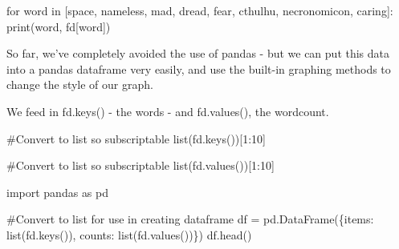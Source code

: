 \documentclass[
  letterpaper,
  DIV=11,
  numbers=noendperiod]{scrreprt}
\newenvironment{Shaded}{\begin{snugshade}}{\end{snugshade}}
\newcommand{\BuiltInTok}[1]{\textcolor[rgb]{0.00,0.23,0.31}{#1}}
\newcommand{\CommentTok}[1]{\textcolor[rgb]{0.37,0.37,0.37}{#1}}
\newcommand{\ControlFlowTok}[1]{\textcolor[rgb]{0.00,0.23,0.31}{#1}}
\newcommand{\DecValTok}[1]{\textcolor[rgb]{0.68,0.00,0.00}{#1}}
\newcommand{\ImportTok}[1]{\textcolor[rgb]{0.00,0.46,0.62}{#1}}
\newcommand{\KeywordTok}[1]{\textcolor[rgb]{0.00,0.23,0.31}{#1}}
\newcommand{\NormalTok}[1]{\textcolor[rgb]{0.00,0.23,0.31}{#1}}
\newcommand{\OperatorTok}[1]{\textcolor[rgb]{0.37,0.37,0.37}{#1}}
\newcommand{\StringTok}[1]{\textcolor[rgb]{0.13,0.47,0.30}{#1}}
\begin{document}
\begin{Shaded}
\begin{Highlighting}[]
\ControlFlowTok{for}\NormalTok{ word }\KeywordTok{in}\NormalTok{ [}\StringTok{\textquotesingle{}space\textquotesingle{}}\NormalTok{, }\StringTok{\textquotesingle{}nameless\textquotesingle{}}\NormalTok{, }\StringTok{\textquotesingle{}mad\textquotesingle{}}\NormalTok{, }\StringTok{\textquotesingle{}dread\textquotesingle{}}\NormalTok{, }\StringTok{\textquotesingle{}fear\textquotesingle{}}\NormalTok{, }\StringTok{\textquotesingle{}cthulhu\textquotesingle{}}\NormalTok{, }\StringTok{\textquotesingle{}necronomicon\textquotesingle{}}\NormalTok{, }\StringTok{\textquotesingle{}caring\textquotesingle{}}\NormalTok{]:}
    \BuiltInTok{print}\NormalTok{(word, fd[word])}
\end{Highlighting}
\end{Shaded}

So far, we've completely avoided the use of pandas - but we can put this
data into a pandas dataframe very easily, and use the built-in graphing
methods to change the style of our graph.

We feed in fd.keys() - the words - and fd.values(), the wordcount.

\begin{Shaded}
\begin{Highlighting}[]
\CommentTok{\#Convert to list so subscriptable}
\BuiltInTok{list}\NormalTok{(fd.keys())[}\DecValTok{1}\NormalTok{:}\DecValTok{10}\NormalTok{]}
\end{Highlighting}
\end{Shaded}

\begin{Shaded}
\begin{Highlighting}[]
\CommentTok{\#Convert to list so subscriptable}
\BuiltInTok{list}\NormalTok{(fd.values())[}\DecValTok{1}\NormalTok{:}\DecValTok{10}\NormalTok{]}
\end{Highlighting}
\end{Shaded}

\begin{Shaded}
\begin{Highlighting}[]
\ImportTok{import}\NormalTok{ pandas }\ImportTok{as}\NormalTok{ pd}

\CommentTok{\#Convert to list for use in creating dataframe}
\NormalTok{df }\OperatorTok{=}\NormalTok{ pd.DataFrame(\{}\StringTok{\textquotesingle{}items\textquotesingle{}}\NormalTok{: }\BuiltInTok{list}\NormalTok{(fd.keys()), }\StringTok{\textquotesingle{}counts\textquotesingle{}}\NormalTok{: }\BuiltInTok{list}\NormalTok{(fd.values())\})}
\NormalTok{df.head()}
\end{Highlighting}
\end{Shaded}
\end{document}
